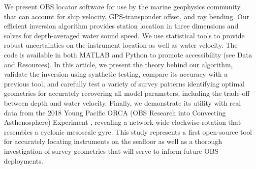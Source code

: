 We present OBS locator software for use by the marine geophysics community that can account for ship velocity, GPS-transponder offset, and ray bending. Our efficient inversion algorithm provides station location in three dimensions and solves for depth-averaged water sound speed. We use statistical tools to provide robust uncertainties on the instrument location as well as water velocity. The code is available in both MATLAB and Python to promote accessibility (see Data and Resources). In this article, we present the theory behind our algorithm, validate the inversion using synthetic testing, compare its accuracy with a previous tool, and carefully test a variety of survey patterns identifying optimal geometries for accurately recovering all model parameters, including the trade-off between depth and water velocity. Finally, we demonstrate its utility with real data from the 2018 Young Pacific ORCA (OBS Research into Convecting Asthenosphere) Experiment \citep{Gaherty2018}, revealing a network-wide clockwise-rotation that resembles a cyclonic mesoscale gyre. This study represents a first open-source tool for accurately locating instruments on the seafloor as well as a thorough investigation of survey geometries that will serve to inform future OBS deployments.